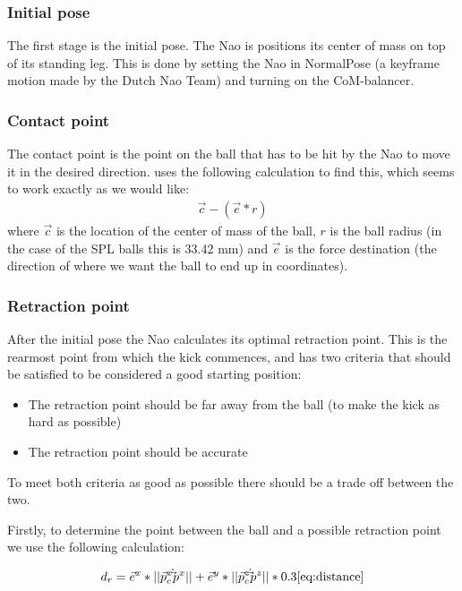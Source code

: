 \documentclass[a4paper]{article}
\begin{document}
\subsubsection{Initial pose}
The first stage is the initial pose. The Nao is positions its center of mass on
top of its standing leg. This is done by setting the Nao in NormalPose (a
keyframe motion made by the Dutch Nao Team) and
turning on the CoM-balancer.

\subsubsection{Contact point}
The contact point is the point on the ball that has to be hit by the Nao to
move it in the desired direction. \cite{Xu2010} uses the following
calculation to find this, which seems to work exactly as we would like:
\begin{align*}
    \vec{c} - ( \vec{e} * r )
\end{align*}
where $\vec{c}$ is the location of the center of mass of the ball, $r$ is the
ball radius (in the case of the SPL balls this is 33.42 mm) and $\vec{e}$ is the
force destination (the direction of where we want the ball to end up in
coordinates).


\subsubsection{Retraction point}
After the initial pose the Nao calculates its optimal retraction point. This
is the rearmost point from which the kick commences, and has two criteria that
should be satisfied to be considered a good starting position:
\begin{itemize}
    \item The retraction point should be far away from the ball (to make the
        kick as hard as possible)
    \item The retraction point should be accurate 
\end{itemize}
To meet both criteria as good as possible there should be a trade off between
the two.

Firstly, to determine the point between the ball and a possible retraction point
we use the following calculation: 

\begin{align}
d_r = \vec{e}^{x} * || \vec{p}_{c}^{x} \dot \vec{p}^{x} || + \vec{e}^y * ||\vec{p}_{c}^z
    \dot \vec{p}^z|| * 0.3
\ref{eq:distance}
\end{align}
\end{document}
